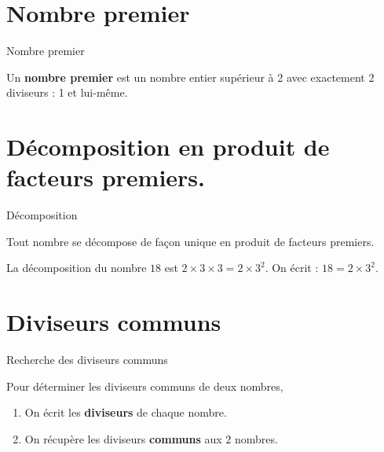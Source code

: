 \begin{pageCours}
 
 
\section{Nombre premier}

 
\begin{DefT}{Nombre premier}

Un \textbf{nombre premier} est un nombre entier supérieur à 2 avec exactement 2 diviseurs : 1 et lui-même. 

\end{DefT}
 

\section{Décomposition en produit de facteurs premiers.}


\begin{DefT}{Décomposition}

Tout nombre se décompose de façon unique en produit de facteurs premiers.

\end{DefT}

 

\begin{Ex} 

La décomposition du nombre $18$ est $2 \times 3 \times 3 = 2 \times 3^2$. On écrit : $18 = 2 \times 3^2$.

\end{Ex}
 
 

 
\section{Diviseurs communs}
 
 
   
\begin{minipage}[t]{0.5\linewidth}
\begin{MtT}{Recherche des diviseurs communs}

Pour déterminer les diviseurs communs de deux nombres, 
\begin{enumerate}[leftmargin=*]
\item On écrit les \textbf{diviseurs} de chaque nombre.
\item On récupère les diviseurs \textbf{communs} aux $2$ nombres.
\end{enumerate}



\end{MtT}
\end{minipage}
\end{pageCours}
